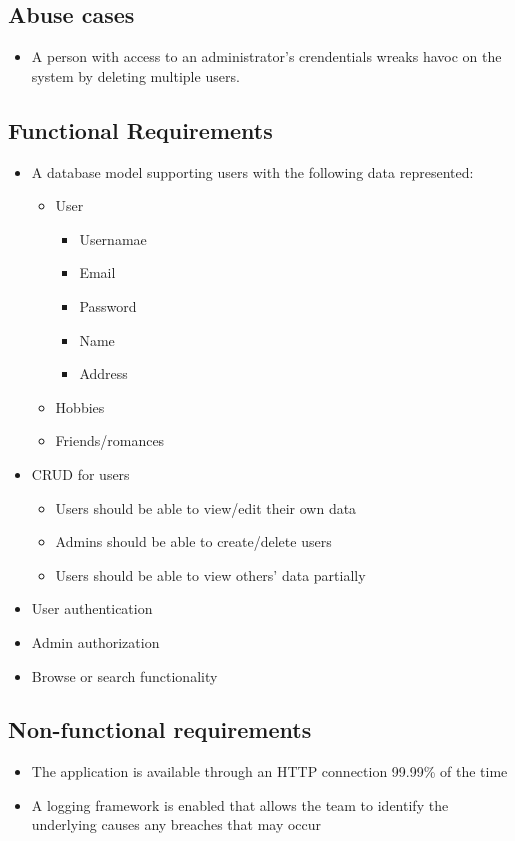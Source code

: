 \documentclass[a4paper]{article}
\begin{document}
\subsection{Abuse cases}
\begin{itemize}
\item A person with access to an administrator's crendentials wreaks havoc on the system by deleting multiple users.
\end{itemize}

\subsection{Functional Requirements}
\begin{itemize}
\item A database model supporting users with the following data represented:
  \begin{itemize}
  \item User
      \begin{itemize}
      \item Usernamae
      \item Email
      \item Password
      \item Name
      \item Address
      \end{itemize}
  \item Hobbies
  \item Friends/romances
  \end{itemize}
\item CRUD for users
	\begin{itemize}
    \item Users should be able to view/edit their own data
    \item Admins should be able to create/delete users
    \item Users should be able to view others' data partially
    \end{itemize}
\item User authentication
\item Admin authorization
\item Browse or search functionality
\end{itemize}

\subsection{Non-functional requirements}
\begin{itemize}
\item The application is available through an HTTP connection 99.99\% of the time
\item A logging framework is enabled that allows the team to identify the underlying causes any breaches that may occur
\end{itemize}
\end{document}
